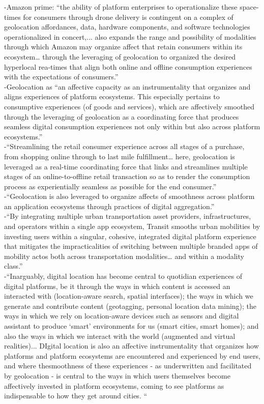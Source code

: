 -{\color{orange}Amazon prime: “the ability of platform enterprises to operationalize these space-times for consumers through drone delivery is contingent on a complex of geolocation affordances, data, hardware components, and software technologies operationalized in concert,... also expands the range and possibility of modalities through which Amazon may organize affect that retain consumers within its ecosystem… through the leveraging of geolocation to organized the desired hyperlocal rea-times that align both online and offline consumption experiences with the expectations of consumers.”\cite{Leszczynski2019}}\\
-{\color{orange}Geolocation as “an affective capacity as an instrumentality that organizes and aligns experiences of platform ecosystems. This especially pertains to consumptive experiences (of goods and services), which are affectively smoothed through the leveraging of geolocation as a coordinating force that produces seamless digital consumption experiences not only within but also across platform ecosystems.”\cite{Leszczynski2019}}\\
-{\color{orange}“Streamlining the retail consumer experience across all stages of a purchase, from shopping online through to last mile fulfillment… here, geolocation is leveraged as a real-time coordinating force that links and streamlines multiple stages of an online-to-offline retail transaction so as to render the consumption process as experientially seamless as possible for the end consumer.”\cite{Leszczynski2019}}\\
-{\color{orange}“Geolocation is also leveraged to organize affects of smoothness across platform an application ecosystems through practices of digital aggregation.”\cite{Leszczynski2019}}\\
-{\color{orange}“By integrating multiple urban transportation asset providers, infrastructures, and operators within a single app ecosystem, Transit smooths urban mobilities by investing users within a singular, cohesive, integrated digital platform experience that mitigates the impracticalities of switching between multiple branded apps of mobility actos both across transportation modalities… and within a modality class.”\cite{Leszczynski2019}}\\
-{\color{orange}“Inarguably, digital location has become central to quotidian experiences of digital platforms, be it through the ways in which content is accessed an interacted with (location-aware search, spatial interfaces); the ways in which we generate and contribute content (geotagging, personal location data mining); the ways in which we rely on location-aware devices such as sensors and digital assistant to produce ‘smart’ environments for us (smart cities, smart homes); and also the ways in which we interact with the world (augmented and virtual realities)... DIgital location is also an affective instrumentality that organizes how platforms and platform ecosystems are encountered and experienced by end users, and where thesmoothness of these experiences - as underwritten and facilitated by geolocation - is central to the ways in which users themselves become affectively invested in platform ecosystems, coming to see platforms as indispensable to how they get around cities. “\cite{Leszczynski2019}}\\
